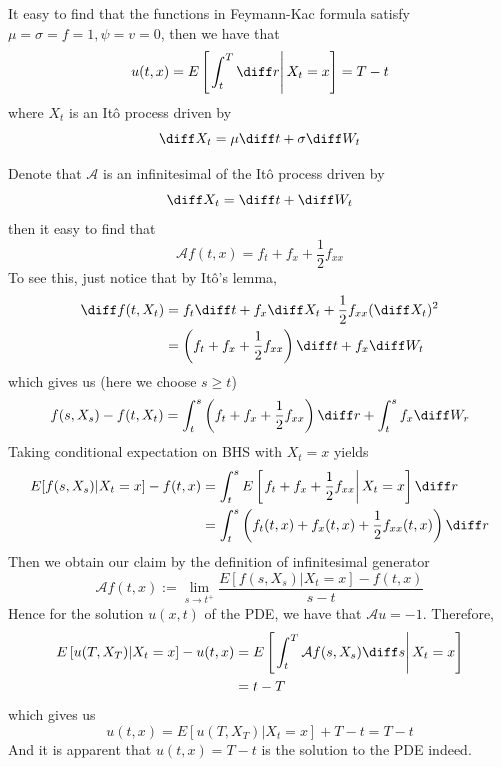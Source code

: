 \begin{subproblem}[(\alph*)]
    \item
    It easy to find that the functions in Feymann-Kac formula
    satisfy $\mu=\sigma=f=1,\psi=v=0$, then we have that 
    \[u(t,x)=E\left[\left.\int_t^T\diff r\right|X_t=x\right]
    =T-t\]
    where $X_t$ is an It\^o process driven by
    \[\diff X_t=\mu\diff t+\sigma\diff W_t\]

    \item
    Denote that $\mathcal A$ is an infinitesimal of
    the It\^o process driven by
    \[\diff X_t=\diff t+\diff W_t\]
    then it easy to find that
    \[\mathcal Af(t,x)=f_t+f_x+\frac{1}{2}f_{xx}\]
    To see this, just notice that by It\^o's lemma,
    \[\begin{aligned}
        \diff f(t,X_t)&=f_t\diff t+f_x\diff X_t+\frac{1}{2}f_{xx}(\diff X_t)^2\\
        &=\left(f_t+f_x+\frac{1}{2}f_{xx}\right)\diff t+f_x\diff W_t
    \end{aligned}\]
    which gives us (here we choose $s\geq t$)
    \[f(s,X_s)-f(t,X_t)=\int_t^s\left(f_t+f_x+\frac{1}{2}f_{xx}\right)\diff r
    +\int_t^s f_x\diff W_r\]
    Taking conditional expectation on BHS with $X_t=x$ yields
    \[\begin{aligned}
        E[f(s,X_s)|X_t=x]-f(t,x)&=\int_t^s E\left[\left.f_t+f_x+\frac{1}{2}f_{xx}\right|X_t=x\right]\diff r\\
        &=\int_t^s \left(f_t(t,x)+f_x(t,x)+\frac{1}{2}f_{xx}(t,x)\right)\diff r
    \end{aligned}\]
    Then we obtain our claim by the definition of infinitesimal generator
    \[\mathcal Af(t,x):=\lim_{s\to t^+}\frac{E[f(s,X_s)|X_t=x]-f(t,x)}{s-t}\]
    Hence for the solution $u(x,t)$ of the PDE, we have
    that $\mathcal Au=-1$.
    Therefore,
    \[\begin{aligned}
        E\left[u(T,X_T)|X_t=x\right]
        -u(t,x)&=
        E\left[\left.\int_t^{T}
        \mathcal Af(s,X_{s})\diff s\right|X_t=x\right]\\
        &=t-T
    \end{aligned}\]
    which gives us
    \[u(t,x)=E[u(T,X_T)|X_t=x]+T-t=T-t\]
    And it is apparent that $u(t,x)=T-t$ is the solution to the
    PDE indeed.
\end{subproblem}

